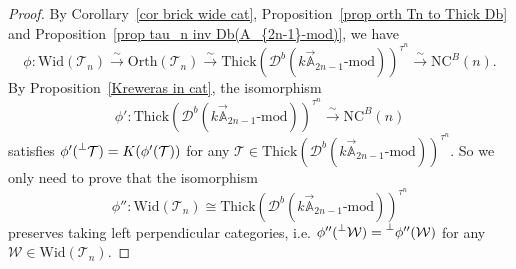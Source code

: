 \documentclass[a4paper, 11pt, reqno]{amsart}
\numberwithin{equation}{section}
\theoremstyle{remark}
\theoremstyle{definition}
\begin{document}
\begin{proof}
   By Corollary~\ref{cor brick wide cat}, Proposition~\ref{prop orth Tn to Thick Db} and Proposition~\ref{prop tau_n inv Db(A_{2n-1}-mod)}, we have
   \[\phi: \mathrm{Wid}(\mathcal T_n) \xrightarrow{\sim} \mathrm{Orth}(\mathcal T_n) \xrightarrow{\sim} \mathrm{Thick}(\mathcal D^b(k \vec{\mathbb A}_{2n-1} \text{-} \mathrm{mod}))^{\tau ^n} \xrightarrow{\sim} \mathrm{NC}^B(n).\]
   By Proposition~\ref{Kreweras in cat}, the isomorphism 
   \[\phi':\mathrm{Thick}(\mathcal D^b(k \vec{\mathbb A}_{2n-1} \text{-} \mathrm{mod}))^{\tau ^n} \xrightarrow{\sim} \mathrm{NC}^B(n)\]
   satisfies $\phi'(\prescript{\perp}{}{\mathcal T})=K(\phi'(\mathcal T))$ for any $\mathcal T \in \mathrm{Thick}(\mathcal D^b(k \vec{\mathbb A}_{2n-1} \text{-} \mathrm{mod}))^{\tau ^n}$. So we only need to prove that the isomorphism
   \[
   \phi'':\mathrm{Wid}(\mathcal T_n) \cong \mathrm{Thick}(\mathcal D^b(k \vec{\mathbb A}_{2n-1} \text{-} \mathrm{mod}))^{\tau ^n}
   \]
   preserves taking left perpendicular categories, i.e. $\phi''(\prescript{\perp}{}{\mathcal W})=\prescript{\perp}{}{\phi''(\mathcal W)}$ for any $\mathcal W \in \mathrm{Wid}(\mathcal T_n)$. 
   

\end{proof}
\end{document}
